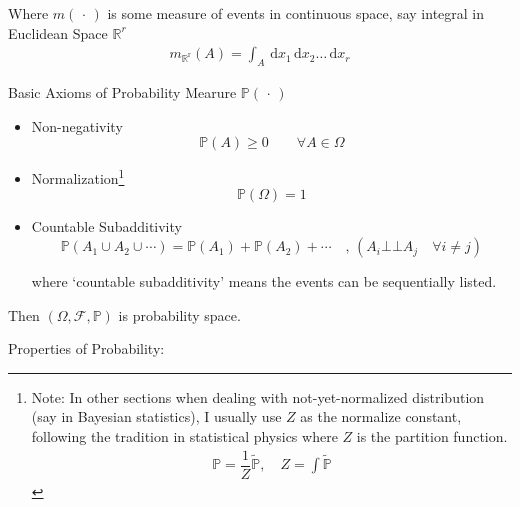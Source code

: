     Where $ m(\, \cdot \, ) $ is some measure of events in continuous space, say integral in Euclidean Space $ \mathbb{R}^r $
    \begin{align}
        m_\mathrm{\mathbb{R}^r}(A)=\int_A \,\mathrm{d}x_1\,\mathrm{d}x_2\ldots\,\mathrm{d}x_r  
    \end{align}
    
    
    
    

    
    
    
\begin{point}
    Basic Axioms of Probability Mearure $ \mathbb{P}(\,\cdot\,) $
\end{point}

\begin{itemize}[itemsep=2pt,topsep=-2pt]
\item Non-negativity
\begin{equation}    \mathbb{P}(A)\geq 0\qquad \forall A\in\Omega    
\end{equation}
\item Normalization\footnote{Note: In other sections when dealing with not-yet-normalized distribution (say in Bayesian statistics), I usually use $ Z $ as the normalize constant, following the tradition in statistical physics where $ Z $ is the partition function.
\begin{align}
    \mathbb{P}=\dfrac{1}{Z}\tilde{\mathbb{P}},\quad Z=\int \mathbb{\tilde{P}} 
\end{align}}
\begin{equation}    \mathbb{P}(\Omega)=1    
\end{equation}




\item Countable Subadditivity
\begin{equation}    \mathbb{P}(A_1\cup A_2\cup\cdots)=\mathbb{P}(A_1)+\mathbb{P}(A_2)+\cdots\quad ,\, (A_i\bot\!\!\!\bot  A_j\quad \forall i\neq j)
\end{equation}

where `countable subadditivity' means the events can be sequentially listed.
\end{itemize}

    Then $(\Omega,\mathscr{F},\mathbb{P})$ is probability space.

\begin{point}
        Properties of Probability:
\end{point}

